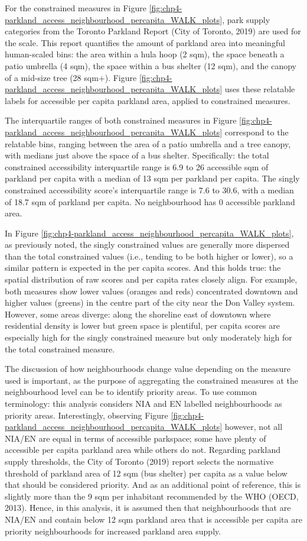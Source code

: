 \documentclass[
11pt, %
oneside, %
english, %
singlespacing, %
]{macthesis} %
\begin{document}
For the constrained measures in Figure \ref{fig:chp4-parkland_access_neighbourhood_percapita_WALK_plots}, park supply categories from the Toronto Parkland Report (City of Toronto, 2019) are used for the scale. This report quantifies the amount of parkland area into meaningful human-scaled bins: the area within a hula hoop (2 sqm), the space beneath a patio umbrella (4 sqm), the space within a bus shelter (12 sqm), and the canopy of a mid-size tree (28 sqm+). Figure \ref{fig:chp4-parkland_access_neighbourhood_percapita_WALK_plots} uses these relatable labels for accessible per capita parkland area, applied to constrained measures.

The interquartile ranges of both constrained measures in Figure \ref{fig:chp4-parkland_access_neighbourhood_percapita_WALK_plots} correspond to the relatable bins, ranging between the area of a patio umbrella and a tree canopy, with medians just above the space of a bus shelter. Specifically: the total constrained accessibility interquartile range is 6.9 to 26 accessible sqm of parkland per capita with a median of 13 sqm per parkland per capita. The singly constrained accessibility score's interquartile range is 7.6 to 30.6, with a median of 18.7 sqm of parkland per capita. No neighbourhood has 0 accessible parkland area.

In Figure \ref{fig:chp4-parkland_access_neighbourhood_percapita_WALK_plots}, as previously noted, the singly constrained values are generally more dispersed than the total constrained values (i.e., tending to be both higher or lower), so a similar pattern is expected in the per capita scores. And this holds true: the spatial distribution of raw scores and per capita rates closely align. For example, both measures show lower values (oranges and reds) concentrated downtown and higher values (greens) in the centre part of the city near the Don Valley system. However, some areas diverge: along the shoreline east of downtown where residential density is lower but green space is plentiful, per capita scores are especially high for the singly constrained measure but only moderately high for the total constrained measure.

The discussion of how neighbourhoods change value depending on the measure used is important, as the purpose of aggregating the constrained measures at the neighbourhood level can be to identify priority areas. To use common terminology: this analysis considers NIA and EN labelled neighbourhoods as priority areas. Interestingly, observing Figure \ref{fig:chp4-parkland_access_neighbourhood_percapita_WALK_plots} however, not all NIA/EN are equal in terms of accessible parkspace; some have plenty of accessible per capita parkland area while others do not. Regarding parkland supply thresholds, the City of Toronto (2019) report selects the normative threshold of parkland area of 12 sqm (bus shelter) per capita as a value below that should be considered priority. And as an additional point of reference, this is slightly more than the 9 sqm per inhabitant recommended by the WHO (OECD, 2013). Hence, in this analysis, it is assumed then that neighbourhoods that are NIA/EN and contain below 12 sqm parkland area that is accessible per capita are priority neighbourhoods for increased parkland area supply.
\end{document}
